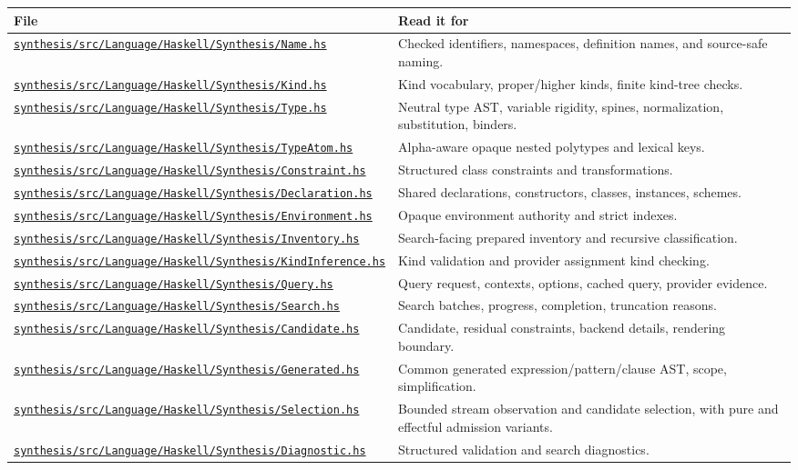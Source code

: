 \documentclass[10pt,letterpaper,oneside]{report}
\def\DjexBase{https://github.com/VladimirReshetnikov/Djex/blob/e454757d53ec057238c22fc6cd0d935b7d96b3dc/}
\newcommand{\dpath}[1]{\href{\DjexBase#1}{\nolinkurl{#1}}}
\begin{document}
\begin{longtable}{@{}L{0.43\textwidth}L{0.49\textwidth}@{}}
\toprule
\textbf{File} & \textbf{Read it for} \\
\midrule
\endhead
\dpath{synthesis/src/Language/Haskell/Synthesis/Name.hs} & Checked identifiers, namespaces, definition names, and source-safe naming. \\
\dpath{synthesis/src/Language/Haskell/Synthesis/Kind.hs} & Kind vocabulary, proper/higher kinds, finite kind-tree checks. \\
\dpath{synthesis/src/Language/Haskell/Synthesis/Type.hs} & Neutral type AST, variable rigidity, spines, normalization, substitution, binders. \\
\dpath{synthesis/src/Language/Haskell/Synthesis/TypeAtom.hs} & Alpha-aware opaque nested polytypes and lexical keys. \\
\dpath{synthesis/src/Language/Haskell/Synthesis/Constraint.hs} & Structured class constraints and transformations. \\
\dpath{synthesis/src/Language/Haskell/Synthesis/Declaration.hs} & Shared declarations, constructors, classes, instances, schemes. \\
\dpath{synthesis/src/Language/Haskell/Synthesis/Environment.hs} & Opaque environment authority and strict indexes. \\
\dpath{synthesis/src/Language/Haskell/Synthesis/Inventory.hs} & Search-facing prepared inventory and recursive classification. \\
\dpath{synthesis/src/Language/Haskell/Synthesis/KindInference.hs} & Kind validation and provider assignment kind checking. \\
\dpath{synthesis/src/Language/Haskell/Synthesis/Query.hs} & Query request, contexts, options, cached query, provider evidence. \\
\dpath{synthesis/src/Language/Haskell/Synthesis/Search.hs} & Search batches, progress, completion, truncation reasons. \\
\dpath{synthesis/src/Language/Haskell/Synthesis/Candidate.hs} & Candidate, residual constraints, backend details, rendering boundary. \\
\dpath{synthesis/src/Language/Haskell/Synthesis/Generated.hs} & Common generated expression/pattern/clause AST, scope, simplification. \\
\dpath{synthesis/src/Language/Haskell/Synthesis/Selection.hs} & Bounded stream observation and candidate selection, with pure and effectful admission variants. \\
\dpath{synthesis/src/Language/Haskell/Synthesis/Diagnostic.hs} & Structured validation and search diagnostics. \\
\bottomrule
\end{longtable}
\end{document}
